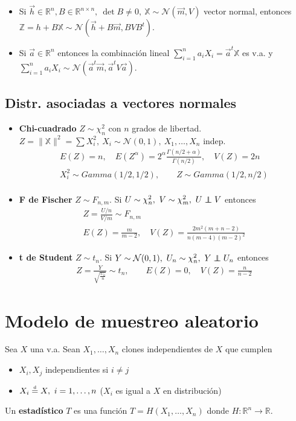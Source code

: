 \documentclass[a4paper,twocolumn]{extarticle}
\theoremstyle{remark}
\newcommand\deq{\mathrel{\overset{\makebox[0pt]{\mbox{\normalfont\tiny d}}}{=}}}
\newcommand\indep{\protect\mathpalette{\protect\independenT}{\perp}}
\def\independenT#1#2{\mathrel{\rlap{$#1#2$}\mkern2mu{#1#2}}}
\newcommand{\X}{\mathbb{X}}
\newcommand{\Z}{\mathbb{Z}}
\newcommand{\R}{\mathbb{R}}
\newcommand{\normal}{\mathcal{N}}
\begin{document}
\begin{itemize}
	\item Si $\vec{h} \in \R^n, B \in \R^{n\times n},\ \det B \neq 0,\ \X \sim \normal(\vec{m}, V)$ vector normal, entonces $\Z = h + B\X \sim \normal(\vec{h} + B\vec{m}, BVB^t)$.

	\item Si $\vec{a} \in \R^n$ entonces la combinación lineal $\sum_{i=1}^n a_iX_i = \vec{a}^t \X$ es v.a. y $\sum_{i=1}^n a_iX_i \sim \normal(\vec{a}^t\vec{m}, \vec{a}^t V \vec{a})$.
\end{itemize}

\subsection{Distr. asociadas a vectores normales}
\begin{itemize}
	\item \textbf{Chi-cuadrado} $Z \sim \chi^2_n$ con $n$ grados de libertad. $Z = \lVert \X \rVert^2 = \sum X_i^2,\ X_i \sim \normal(0, 1),\ X_1,\dots, X_n$ indep.
	\begin{align*}
	E(Z) = n,\quad E(Z^\alpha) = 2^\alpha \frac{\Gamma(n/2 + \alpha)}{\Gamma(n/2)}, \quad V(Z) = 2n \\
	X_i^2 \sim Gamma(1/2, 1/2), \qquad Z \sim Gamma(1/2, n/2) \\
	\end{align*}
	\item \textbf{F de Fischer} $Z \sim F_{n,m}$. Si $U \sim \chi^2_n,\ V \sim \chi^2_m,\ U \indep V$ entonces
	\begin{align*}
	Z = \frac{U/n}{V/m} \sim F_{n,m} \\
	E(Z) = \frac{m}{m-2},\quad V(Z) = \frac{2m^2(m+n-2)}{n(m-4)(m-2)^2}
	\end{align*}
	
	\item \textbf{t de Student} $Z \sim t_n$. Si $Y \sim \normal(0,1),\ U_n \sim \chi^2_n,\ Y \indep U_n$ entonces
	\begin{align*}
	Z = \frac{Y}{\sqrt{\frac{U_n}{n}}} \sim t_n, \qquad
	E(Z) = 0,\quad V(Z) = \frac{n}{n-2}
	\end{align*}
\end{itemize}

\section{Modelo de muestreo aleatorio}

Sea $X$ una v.a. Sean $X_1, \dots, X_n$ clones independientes de $X$ que cumplen
\begin{itemize}
	\item $X_i, X_j$ independientes si $i\neq j$
	\item $X_i \deq X,\ i = 1,\dots, n$ ($X_i$ es igual a $X$ en distribución)
\end{itemize}
Un \textbf{estadístico} $T$ es una función $T = H(X_1, \dots, X_n)$ donde $H:\R^n \to \R$.
\end{document}
